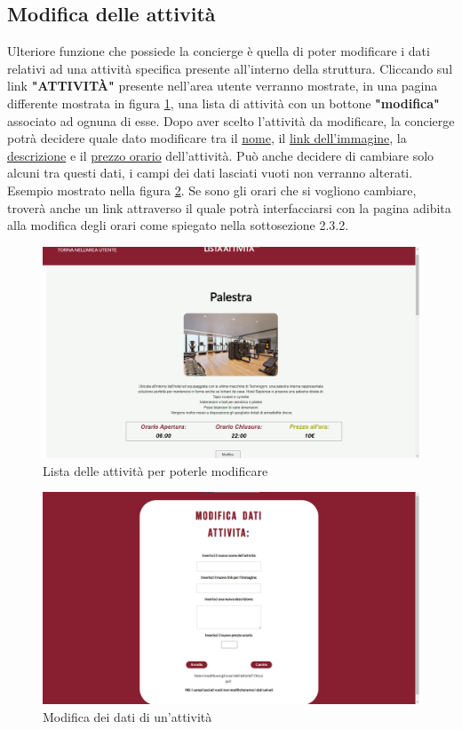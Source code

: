\documentclass [a4paper, 12pt]{book}
\begin{document}
\subsection{Modifica delle attività}
Ulteriore funzione che possiede la concierge è quella di poter modificare i dati relativi ad una attività specifica presente all'interno della struttura. Cliccando sul link \textbf{"ATTIVITÀ"} presente nell'area utente verranno mostrate, in una pagina differente mostrata in figura \ref{ListaAttivitaStaff}, una lista di attività con un bottone \textbf{"modifica"} associato ad ognuna di esse. Dopo aver scelto l'attività da modificare, la concierge potrà decidere quale dato modificare tra il \underline{nome}, il \underline{link dell'immagine}, la \underline{descrizione} e il \underline{prezzo orario} dell'attività. Può anche decidere di cambiare solo alcuni tra questi dati, i campi dei dati lasciati vuoti non verranno alterati. Esempio mostrato nella figura \ref{ModificaAttivita}. Se sono gli orari che si vogliono cambiare, troverà anche un link attraverso il quale potrà interfacciarsi con la pagina adibita alla modifica degli orari come spiegato nella sottosezione 2.3.2.\pagebreak
\begin{figure}[!h]
\centering
\includegraphics[scale=0.3]{ListaAttivitaStaff.png}
\caption{Lista delle attività per poterle modificare}
\label{ListaAttivitaStaff}
\end{figure}

\begin{figure}[!h]
\centering
\includegraphics[scale=0.3]{ModificaAttivita.png}
\caption{Modifica dei dati di un'attività}
\label{ModificaAttivita}
\end{figure}\pagebreak
\end{document}
